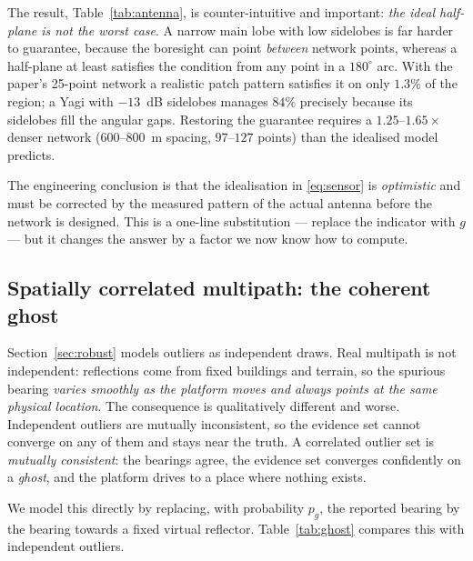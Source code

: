 \documentclass[preprint,12pt,3p]{elsarticle}
\theoremstyle{definition}
\begin{document}
The result, Table~\ref{tab:antenna}, is counter-intuitive and important: \emph{the ideal
half-plane is not the worst case}. A narrow main lobe with low sidelobes is far harder to
guarantee, because the boresight can point \emph{between} network points, whereas a half-plane at
least satisfies the condition from any point in a $180^\circ$ arc. With the paper's 25-point
network a realistic patch pattern satisfies it on only $1.3\%$ of the region; a Yagi with $-13$~dB
sidelobes manages $84\%$ precisely because its sidelobes fill the angular gaps. Restoring the
guarantee requires a $1.25$--$1.65\times$ denser network ($600$--$800$~m spacing,
$97$--$127$ points) than the idealised model predicts.

The engineering conclusion is that the idealisation in \eqref{eq:sensor} is \emph{optimistic} and
must be corrected by the measured pattern of the actual antenna before the network is designed.
This is a one-line substitution --- replace the indicator with $g$ --- but it changes the answer by
a factor we now know how to compute.

\subsection{Spatially correlated multipath: the coherent ghost}
\label{sec:ghost}

Section~\ref{sec:robust} models outliers as independent draws. Real multipath is not independent:
reflections come from fixed buildings and terrain, so the spurious bearing \emph{varies smoothly as
the platform moves and always points at the same physical location}. The consequence is
qualitatively different and worse. Independent outliers are mutually inconsistent, so the evidence
set cannot converge on any of them and stays near the truth. A correlated outlier set is
\emph{mutually consistent}: the bearings agree, the evidence set converges confidently on a
\emph{ghost}, and the platform drives to a place where nothing exists.

We model this directly by replacing, with probability $p_g$, the reported bearing by the bearing
towards a fixed virtual reflector. Table~\ref{tab:ghost} compares this with independent outliers.
\end{document}
